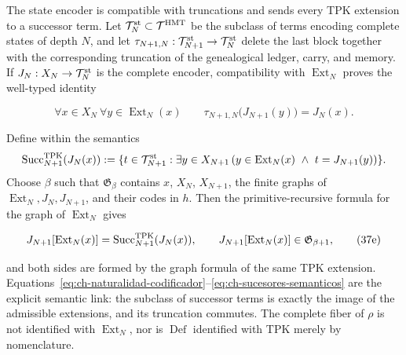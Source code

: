 The state encoder is compatible with truncations and sends every TPK extension
to a successor term. Let
\(\mathcal T_N^{\rm st}\subset\mathcal T^{\rm HMT}\) be the subclass of terms
encoding complete states of depth \(N\), and let
\(\tau_{N+1,N}:\mathcal T_{N+1}^{\rm st}\to\mathcal T_N^{\rm st}\) delete the
last block together with the corresponding truncation of the genealogical
ledger, carry, and memory. If \(J_N:X_N\to\mathcal T_N^{\rm st}\) is the
complete encoder, compatibility with \(\operatorname{Ext}_N\) proves the
well-typed identity

\[
 \forall x\in X_N\ \forall y\in\operatorname{Ext}_N(x)\qquad
 \tau_{N+1,N}\bigl(J_{N+1}(y)\bigr)=J_N(x).
\tag{37e$_0$}\label{eq:ch-naturalidad-codificador}
\]

Define within the semantics
\[
 \operatorname{Succ}^{\rm TPK}_{N+1}(J_N(x)):=
 \{t\in\mathcal T_{N+1}^{\rm st}:\exists y\in X_{N+1}\,
   (y\in\operatorname{Ext}_N(x)\ \wedge\ t=J_{N+1}(y))\}.
\]
Choose \(\beta\) such that \(\mathfrak G_\beta\) contains \(x\), \(X_N\),
\(X_{N+1}\), the finite graphs of
\(\operatorname{Ext}_N,J_N,J_{N+1}\), and their codes in \(h\). Then the
primitive-recursive formula for the graph of \(\operatorname{Ext}_N\) gives

\[
 J_{N+1}[\operatorname{Ext}_N(x)]
 =\operatorname{Succ}^{\rm TPK}_{N+1}(J_N(x)),
 \qquad
 J_{N+1}[\operatorname{Ext}_N(x)]
 \in\mathfrak G_{\beta+1},
\tag{37e}\label{eq:ch-sucesores-semanticos}
\]

and both sides are formed by the graph formula of the same TPK extension.
Equations~\eqref{eq:ch-naturalidad-codificador}--\eqref{eq:ch-sucesores-semanticos}
are the explicit semantic link: the subclass of successor terms is exactly the
image of the admissible extensions, and its truncation commutes. The complete
fiber of \(\rho\) is not identified with \(\operatorname{Ext}_N\), nor is
\(\operatorname{Def}\) identified with TPK merely by nomenclature.

